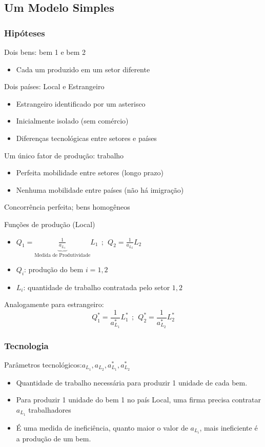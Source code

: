 \documentclass[a4paper,12pt]{article}[abntex2]
\begin{document}
\subsection{\textbf{Um Modelo Simples}}
\subsubsection{\textbf{Hipóteses}}
Dois bens: bem 1 e bem 2
\begin{itemize}
    \item Cada um produzido em um setor diferente
\end{itemize}

Dois países: Local e Estrangeiro
\begin{itemize}
    \item Estrangeiro identificado por um asterisco
    \item Inicialmente isolado (sem comércio)
    \item Diferenças tecnológicas entre setores e países
\end{itemize}

Um único fator de produção: trabalho
\begin{itemize}
    \item Perfeita mobilidade entre setores (longo prazo)
    \item Nenhuma mobilidade entre países (não há imigração)
\end{itemize}

Concorrência perfeita; bens homogêneos

Funções de produção (Local)\begin{itemize}
    \item \(Q_1= \underbrace{\frac{1}{a_{L_1}}}_\text{Medida de Produtividade}L_1 \ \ ; \ \ Q_2= \frac{1}{a_{L_2}}L_2\)
    \item \(Q_i\): produção do bem \(i=1,2\)
    \item \(L_i\): quantidade de trabalho contratada pelo setor \(1,2\)
\end{itemize}

Analogamente para estrangeiro:
\[
Q^*_1=\frac{1}{a_{L_1}^*}L_1^* \ \ ; \ \ Q^*_2=\frac{1}{a_{L_2}^*}L_2^*
\]

\subsubsection{\textbf{Tecnologia}}
Parâmetros tecnológicos:\(a_{L_1},a_{L_2},a_{L_1}^*,a_{L_2}^*\)\begin{itemize}
    \item Quantidade de trabalho necessária para produzir 1 unidade de cada bem.
    \item Para produzir 1 unidade do bem 1 no país Local, uma firma precisa contratar \(a_{L_1}\) trabalhadores
    \item É uma medida de ineficiência, quanto maior o valor de \(a_{L_i}\), mais ineficiente é a produção de um bem. 
\end{itemize}
\end{document}
